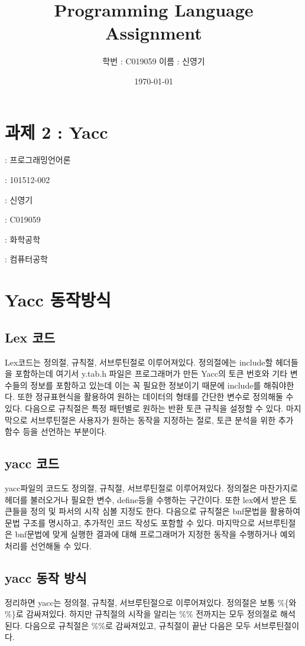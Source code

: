 \documentclass[11pt,oneside,a4paper]{article}
\begin{document}
\title{Programming Language Assignment}
\author{학번 : C019059 이름 : 신영기}
\date{\today}
\maketitle{}

\section{과제 2 : Yacc}

 : 프로그래밍언어론

 : 101512-002

 : 신영기

 : C019059

 : 화학공학

 : 컴퓨터공학

\section{Yacc 동작방식}
\subsection{Lex 코드}
Lex코드는 정의절, 규칙절, 서브루틴절로 이루어져있다. 
정의절에는 include할 헤더들을 포함하는데 여기서 y.tab.h 파일은 프로그래머가 만든 Yacc의 토큰 번호와 기타 변수들의 정보를 포함하고 있는데
이는 꼭 필요한 정보이기 때문에 include를 해줘야한다.
또한 정규표현식을 활용하여 원하는 데이터의 형태를 간단한 변수로 정의해둘 수 있다.
다음으로 규칙절은 특정 패턴별로 원하는 반환 토큰 규칙을 설정할 수 있다.
마지막으로 서브루틴절은 사용자가 원하는 동작을 지정하는 절로, 토큰 분석을 위한 추가 함수 등을 선언하는 부분이다.\\

\subsection{yacc 코드}
yacc파일의 코드도 정의절, 규칙절, 서브루틴절로 이루어져있다.
정의절은 마찬가지로 헤더를 불러오거나 필요한 변수, define등을 수행하는 구간이다. 
또한 lex에서 받은 토큰들을 정의 및 파서의 시작 심볼 지정도 한다.
다음으로 규칙절은 bnf문법을 활용하여 문법 구조를 명시하고, 추가적인 코드 작성도 포함할 수 있다.
마지막으로 서브루틴절은 bnf문법에 맞게 실행한 결과에 대해 프로그래머가 지정한 동작을 수행하거나 예외처리를 선언해둘 수 있다.\\

\subsection{yacc 동작 방식}
정리하면 yacc는 정의절, 규칙절, 서브루틴절으로 이루어져있다. 정의절은 보통 \%\{와 \%\}로 감싸져있다. 
하지만 규칙절의 시작을 알리는 \%\% 전까지는 모두 정의절로 해석된다.
다음으로 규칙절은 \%\%로 감싸져있고, 규칙절이 끝난 다음은 모두 서브루틴절이다.\\
\end{document}
